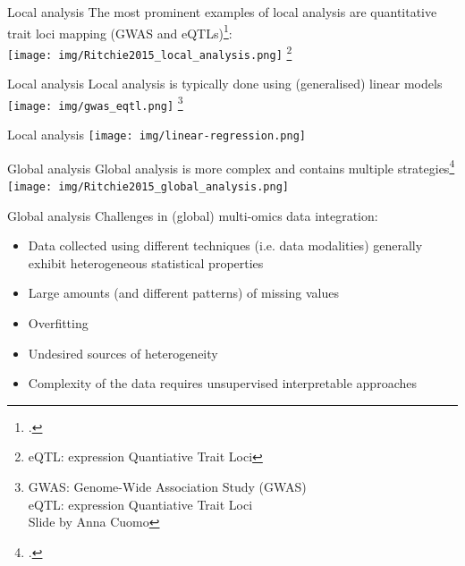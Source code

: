 \documentclass[aspectratio=169,notes]{beamer}
\newcommand\blfootnote[1]{%
  \begingroup
  \renewcommand\thefootnote{}\footnote{#1}%
  \addtocounter{footnote}{-1}%
  \endgroup
}
\begin{document}
	\begin{frame}{Local analysis}
	The most prominent examples of local analysis are quantitative trait loci mapping (GWAS and eQTLs)\footcite{Ritchie2015}:\\
	\leavevmode\newline
	\centering
	\texttt{[image: img/Ritchie2015\_local\_analysis.png]}
	\blfootnote{eQTL: expression Quantiative Trait Loci}
	\end{frame}

	\begin{frame}{Local analysis}
	Local analysis is typically done using (generalised) linear models\\
	\leavevmode\newline
	\centering
	\texttt{[image: img/gwas\_eqtl.png]}
	\blfootnote{GWAS: Genome-Wide Association Study (GWAS)\\eQTL: expression Quantiative Trait Loci\\Slide by Anna Cuomo}
	\end{frame}

	\begin{frame}{Local analysis}
	\centering
	\texttt{[image: img/linear-regression.png]}
	\end{frame}



	\begin{frame}{Global analysis}
	Global analysis is more complex and contains multiple strategies\footcite{Ritchie2015}\\
	\leavevmode\newline
	\centering
	\texttt{[image: img/Ritchie2015\_global\_analysis.png]}
	\end{frame}

	\begin{frame}{Global analysis}
	Challenges in (global) multi-omics data integration:
	\begin{itemize}
		\item Data collected using different techniques (i.e. data modalities) generally exhibit heterogeneous statistical properties
		\item Large amounts (and different patterns) of missing values
		\item Overfitting
		\item Undesired sources of heterogeneity
		\item Complexity of the data requires unsupervised interpretable approaches
	\end{itemize}
	\end{frame}
\end{document}
